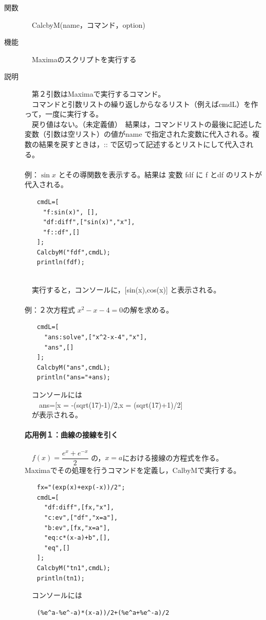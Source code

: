 \documentclass[papersize,a4paper,12pt,uplatex]{jsarticle}
\begin{document}
\begin{description}

\hypertarget{calcbyM}{}
\item[関数]　CalcbyM(name，コマンド，option)
\item[機能]　Maximaのスクリプトを実行する
\item[説明]　第２引数はMaximaで実行するコマンド。\\
　コマンドと引数リストの繰り返しからなるリスト（例えばcmdL）を作って，一度に実行する。\\
　戻り値はない。（未定義値）　結果は，コマンドリストの最後に記述した変数（引数は空リスト）の値がname で指定された変数に代入される。複数の結果を戻すときは，:: で区切って記述するとリストにして代入される。\\
　\\
例：$\sin x$ とその導関数を表示する。結果は 変数 fdf に f とdf のリストが代入される。
\begin{verbatim}
　　cmdL=[
　　　"f:sin(x)", [],
　　　"df:diff",["sin(x)","x"],
　　　"f::df",[]
　　];
　　CalcbyM("fdf",cmdL);
　　println(fdf);
\end{verbatim}
　\\
　実行すると，コンソールに，[sin(x),cos(x)]  と表示される。\\
　\\
例：２次方程式 $x^2-x-4=0$の解を求める。
\begin{verbatim}
　　cmdL=[
　　  "ans:solve",["x^2-x-4","x"],
　　  "ans",[]
　　];
　　CalcbyM("ans",cmdL);
　　println("ans="+ans);
\end{verbatim}
　コンソールには\\
　　ans=[x = -(sqrt(17)-1)/2,x = (sqrt(17)+1)/2] \\
　が表示される。\\
　\\
{\bf 応用例１：曲線の接線を引く}\\
　\\
　$f(x)=\dfrac{e^x+e^{-x}}{2}$ の，$x=a$における接線の方程式を作る。\\
Maximaでその処理を行うコマンドを定義し，CalbyMで実行する。
\begin{verbatim}
　　fx="(exp(x)+exp(-x))/2";
　　cmdL=[
　　  "df:diff",[fx,"x"],
　　  "c:ev",["df","x=a"],
　　  "b:ev",[fx,"x=a"],
　　  "eq:c*(x-a)+b",[],
 　　 "eq",[]
　　];
　　CalcbyM("tn1",cmdL);
　　println(tn1);
\end{verbatim}
　コンソールには
\begin{verbatim}
　　(%e^a-%e^-a)*(x-a))/2+(%e^a+%e^-a)/2 

\end{verbatim}
\end{description}
\end{document}
